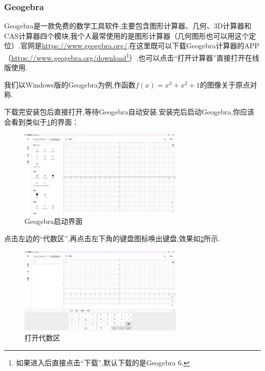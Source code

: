 \documentclass[lang=cn,math=cm,chinesefont=nofont,11pt,scheme=chinese,twocol]{elegantbook}
\begin{document}
\subsubsection{Geogebra}

Geogebra是一款免费的数学工具软件,主要包含图形计算器、几何、3D计算器和CAS计算器四个模块,我个人最常使用的是图形计算器（几何图形也可以用这个定位）.官网是\href{https://www.geogebra.org/}{https://www.geogebra.org/},在这里既可以下载Geogebra计算器的APP（\href{https://www.geogebra.org/download}{https://www.geogebra.org/download}\footnote{如果进入后直接点击“下载”,默认下载的是Geogebra 6.}）,也可以点击“打开计算器”直接打开在线版使用.

我们以Windows版的Geogebra为例,作函数$f(x)=x^3+x^2+1$的图像关于原点对称.

下载完安装包后直接打开,等待Geogebra自动安装.安装完后启动Geogebra,你应该会看到类似于\ref{img:geogebra1}的界面：

\begin{figure}[h]
  \centering
  \includegraphics[width=0.7\textwidth]{image/geogebra1.png}
  \caption{Geogebra启动界面}
  \label{img:geogebra1}
\end{figure}



\hspace*{\fill}

点击左边的“代数区”,再点击左下角的键盘图标唤出键盘,效果如\ref{img:geogebra2}所示.

\begin{figure}[h]
  \centering
  \includegraphics[width=0.7\textwidth]{image/geogebra2.png}
  \caption{打开代数区}
  \label{img:geogebra2}
\end{figure}
\end{document}

